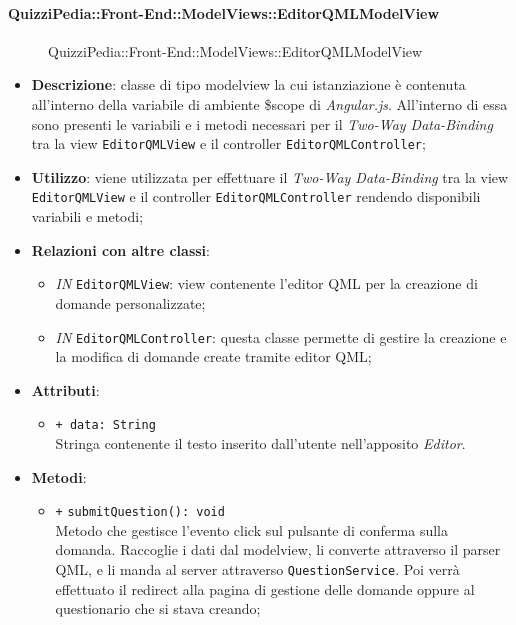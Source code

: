 \paragraph{QuizziPedia::Front-End::ModelViews::EditorQMLModelView}
\begin{figure} [ht]
	\centering
	\caption{QuizziPedia::Front-End::ModelViews::EditorQMLModelView}
\end{figure} \FloatBarrier
\begin{itemize}
	\item \textbf{Descrizione}: classe di tipo modelview la cui istanziazione è contenuta all'interno della variabile di ambiente \$scope di \textit{Angular.js}. All'interno di essa sono presenti le variabili e i metodi necessari per il \textit{Two-Way Data-Binding} tra la view \texttt{EditorQMLView} e il controller \texttt{EditorQMLController}; 
	\item \textbf{Utilizzo}: viene utilizzata per effettuare il \textit{Two-Way Data-Binding} tra la view \texttt{EditorQMLView} e il controller \texttt{EditorQMLController} rendendo disponibili variabili e metodi;
	\item \textbf{Relazioni con altre classi}:
	\begin{itemize}
		\item \textit{IN} \texttt{EditorQMLView}: view contenente l'editor QML per la creazione di domande personalizzate; 
		\item \textit{IN} \texttt{EditorQMLController}: questa classe permette di gestire la creazione e la modifica di domande create tramite editor QML;
	\end{itemize}
	\item \textbf{Attributi}:
	\begin{itemize}
		\item \texttt{+ data: String} \\ Stringa contenente il testo inserito dall'utente nell'apposito \textit{Editor}.
	\end{itemize}
	\item \textbf{Metodi}:
	\begin{itemize}
		\item \texttt{+} \texttt{submitQuestion(): void}\\ 
		Metodo che gestisce l’evento click sul pulsante di conferma sulla domanda. Raccoglie i dati dal modelview, li converte attraverso il parser QML, e li manda al server attraverso \texttt{QuestionService}. Poi verrà effettuato il redirect alla pagina di gestione delle domande oppure al questionario che si stava creando;
	\end{itemize}
\end{itemize}